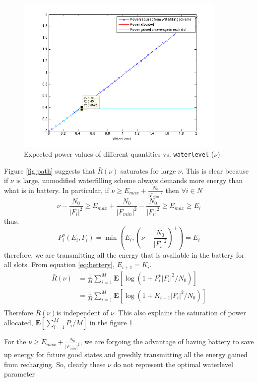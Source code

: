 \documentclass[a4paper,11pt]{article}
\begin{document}
\begin{figure}[h]
\centering
\includegraphics [width=4in]{AverageSimulation_01.png}
\caption{Expected power values of different quantities vs. \texttt{waterlevel} ($\nu$)}
\label{fig:power}
\end{figure}


Figure \ref{fig:path} suggests that $\bar{R}(\nu)$ saturates for large $\nu$. 
This is clear because if $\nu$ is large, unmodified waterfilling scheme always demands more energy than what is in battery. 
In particular, if $\nu\geq E_{max} + \frac{N_0}{|F_{min}|^2}$ then $\forall i \in N$
\[ \nu - \frac{N_0}{|F_i|^2} \geq  E_{max} + \frac{N_0}{|F_{min}|^2} - \frac{N_0}{|F_i|^2} \geq E_{max} \geq E_i\]
thus, 
\[P_i^\nu(E_i,F_i) = \min\left(E_{i},\left (\nu - \frac{N_0}{|F_i|^2} \right )^+\right)
 = E_i
\] 
therefore, we are transmitting all the energy that is available in the battery for all slots. From equation \ref{eq:bettery}, $E_{i+1} = K_i$. 
\begin{align*}
\bar{R}(\nu) &=  \frac{1}{M}\sum_{i=1}^M\mathbf{E} [\log(1+ P_i^\nu |F_i|^2/N_0)] \\
&= \frac{1}{M}\sum_{i=1}^M\mathbf{E} [\log(1+ K_{i-1}|F_i|^2/N_0)] \\
\end{align*}
Therefore $\bar{R}(\nu)$is independent of $\nu$. This also explains the saturation of power allocated, $\mathbf{E}[\sum_{i=1}^MP_i/M]$ in the figure \ref{fig:power}

For the $\nu \geq E_{max} + \frac{N_0}{|F_{min}|^2}$, we are forgoing the advantage of having battery to save up energy for future good states and greedily transmitting all the energy
gained from recharging. So, clearly these $\nu$ do not represent the optimal waterlevel parameter

\medskip
\end{document}
